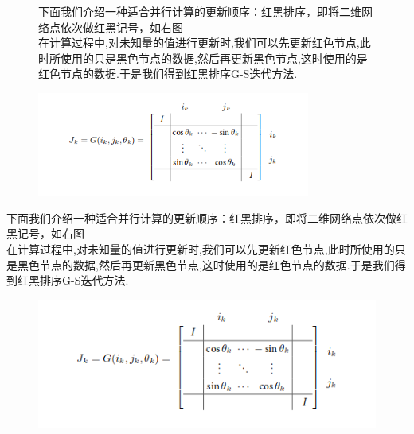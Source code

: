 \documentclass[12pt,a4paper]{article}
\begin{document}
\begin{figure}[h]
\begin{minipage}[l]{0.65\linewidth} 
	下面我们介绍一种适合并行计算的更新顺序：{\color{blue}红黑排序}，即将二维网络点依次做红黑记号，如右图\\
	在计算过程中,对未知量的值进行更新时,我们可以先更新红色节点,此时所使用的只是黑色节点的数据,然后再更新黑色节点,这时使用的是红色节点的数据.于是我们得到红黑排序G-S迭代方法.\\
\end{minipage} 
\hfill 
\begin{minipage}[t]{0.35\linewidth} 
	\centering 
	\includegraphics[width=0.8\textwidth]{figurest/figure_1.png} 
\end{minipage} 
\end{figure}
下面我们介绍一种适合并行计算的更新顺序：{\color{blue}红黑排序}，即将二维网络点依次做红黑记号，如右图\\
在计算过程中,对未知量的值进行更新时,我们可以先更新红色节点,此时所使用的只是黑色节点的数据,然后再更新黑色节点,这时使用的是红色节点的数据.于是我们得到红黑排序G-S迭代方法.\\
\begin{figure}[h]%
	\centering  %
	\includegraphics[width=0.7\linewidth]{figurest/figure_1.png}  %
	\caption{}  %
	\label{fig:mcmthesis-logo}   %
\end{figure}
\end{document}
